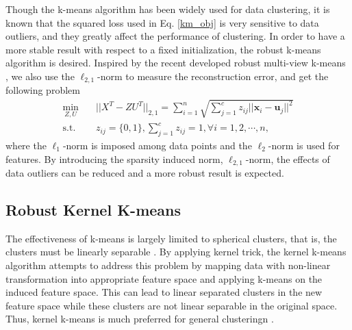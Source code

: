 \documentclass{article}
\newcommand{\st}{\mathrm{s.t.}}
\begin{document}
Though the k-means algorithm has been widely used for data clustering, it is known that the squared loss used in Eq. \eqref{km_obj} is very sensitive to data outliers, and they greatly affect the performance of clustering. In order to have a more stable result with respect to a fixed initialization, the robust k-means algorithm is desired. Inspired by the recent developed robust multi-view k-means \cite{cai2013multi}, we also use the $\ell_{2,1}$-norm to measure the reconstruction error, and get the following problem
\begin{align}\label{l21_km_obj}
	\min_{Z,U} \quad& ||X^T - Z U^T||_{2,1} = \sum_{i=1}^{n} \sqrt{\sum_{j=1}^{c}z_{ij}||\bm{x}_i - \bm{u}_j||^2} \\
\st \quad& z_{ij} = \{0, 1\}, \sum_{j=1}^{c} z_{ij} = 1, \forall i=1,2,\cdots,n, \nonumber
\end{align}
where the $\ell_{1}$-norm is imposed among data points and the $\ell_{2}$-norm is used for features. By introducing the sparsity induced norm, $\ell_{2,1}$-norm, the effects of data outliers can be reduced and a more robust result is expected.

\subsection{Robust Kernel K-means}
The effectiveness of k-means is largely limited to spherical clusters, that is, the clusters must be linearly separable \cite{dhillon2004kernel}. By applying kernel trick, the kernel k-means \cite{scholkopf1998nonlinear} algorithm attempts to address this problem by mapping data with non-linear transformation into appropriate feature space and applying k-means on the induced feature space. This can lead to linear separated clusters in the new feature space while these clusters are not linear separable in the original space. Thus, kernel k-means is much preferred for general clusteringn \cite{bishop2006pattern}.
\end{document}

